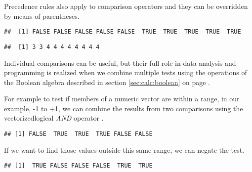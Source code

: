 \documentclass[krantz2]{krantz}\usepackage{knitr}
\begin{document}
Precedence rules also apply to comparison operators and they can be overridden by means of parentheses.

\begin{knitrout}\footnotesize
{}\color{fgcolor}\begin{kframe}
\begin{alltt}
 \hlopt{>}  \hlopt{+} 
\end{alltt}
\begin{verbatim}
##  [1] FALSE FALSE FALSE FALSE FALSE  TRUE  TRUE  TRUE  TRUE  TRUE
\end{verbatim}
\begin{alltt}
 \hlopt{>} \hlstd{)} \hlopt{+} 
\end{alltt}
\begin{verbatim}
##  [1] 3 3 4 4 4 4 4 4 4 4
\end{verbatim}
\end{kframe}
\end{knitrout}

Individual comparisons can be useful, but their full role in data analysis and programming is realized when we combine multiple tests using the operations of the Boolean algebra described in section \ref{sec:calc:boolean} on page \pageref{sec:calc:boolean}.

For example to test if members of a numeric vector are within a range, in our example, -1 to +1, we can combine the results from two comparisons using the vectorizedlogical \emph{AND} operator \Roperator{\&}.

\begin{knitrout}\footnotesize
{}\color{fgcolor}\begin{kframe}
\begin{alltt}
 \hlkwb{<-} \hlopt{-}\hlopt{:}
 \hlopt{>= -} \hlopt{&}  \hlopt{<=} 
\end{alltt}
\begin{verbatim}
## [1] FALSE  TRUE  TRUE  TRUE FALSE FALSE
\end{verbatim}
\end{kframe}
\end{knitrout}

If we want to find those values outside this same range, we can negate the test.

\begin{knitrout}\footnotesize
{}\color{fgcolor}\begin{kframe}
\begin{alltt}
 \hlkwb{<-} \hlopt{-}\hlopt{:}
\hlopt{!} \hlopt{>= -} \hlopt{&}  \hlopt{<=} \hlstd{)}
\end{alltt}
\begin{verbatim}
## [1]  TRUE FALSE FALSE FALSE  TRUE  TRUE
\end{verbatim}
\end{kframe}
\end{knitrout}
\end{document}
